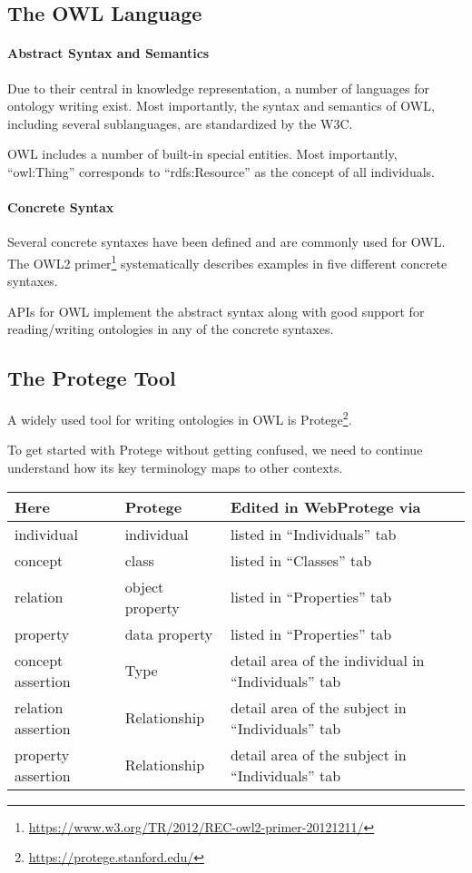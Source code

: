 \subsection{The OWL Language}

\paragraph{Abstract Syntax and Semantics}
Due to their central in knowledge representation, a number of languages for ontology writing exist.
Most importantly, the syntax and semantics of OWL, including several sublanguages, are standardized by the W3C.

OWL includes a number of built-in special entities.
Most importantly, \enquote{owl:Thing} corresponds to \enquote{rdfs:Resource} as the concept of all individuals.

\paragraph{Concrete Syntax}
Several concrete syntaxes have been defined and are commonly used for OWL\@.
The OWL2 primer\footnote{\url{https://www.w3.org/TR/2012/REC-owl2-primer-20121211/}} systematically describes examples in five different concrete syntaxes.

APIs for OWL implement the abstract syntax along with good support for reading/writing ontologies in any of the concrete syntaxes.

\subsection{The Protege Tool}

A widely used tool for writing ontologies in OWL is Protege\footnote{\url{https://protege.stanford.edu/}}.

To get started with Protege without getting confused, we need to continue understand how its key terminology maps to other contexts.
\begin{center}
\begin{tabular}{l@{\qquad}ll}
\toprule
 Here       & Protege & Edited in WebProtege via \\
 \midrule
individual & individual & listed in \enquote{Individuals} tab\\
concept    & class   & listed in \enquote{Classes} tab  \\
relation   & object property & listed in \enquote{Properties} tab\\
property   & data property & listed in \enquote{Properties} tab\\
concept assertion & Type & detail area of the individual in \enquote{Individuals} tab \\
relation assertion & Relationship & detail area of the subject in \enquote{Individuals} tab \\
property assertion & Relationship & detail area of the subject in \enquote{Individuals} tab \\
\bottomrule
\end{tabular}
\end{center}

